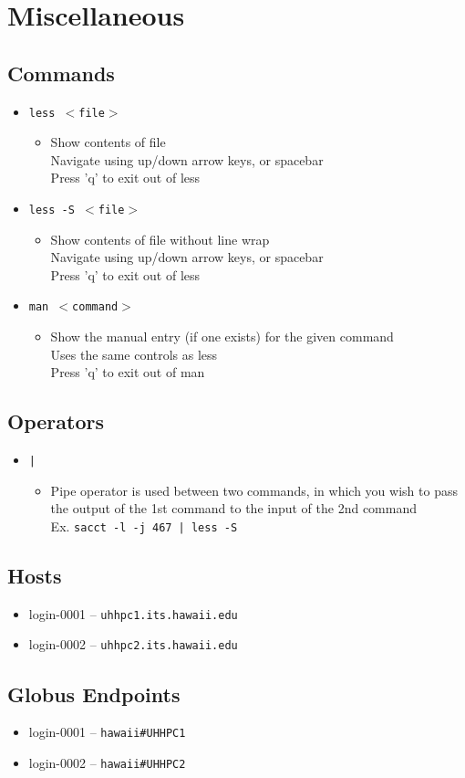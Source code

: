 \documentclass[11pt,twocolumn]{article}
\newcommand{\lft}{$<$}
\newcommand{\rht}{$>$}
\newcommand{\pth}[1]{{\lft}#1{\rht}}
\newcommand{\desc}[1]{\small \begin{itemize}\item[]#1\end{itemize}}
\begin{document}
\section{Miscellaneous}
\subsection{Commands}
\begin{itemize}
\item[] \texttt{less \pth{file}} \desc{Show contents of file\\Navigate using up/down arrow keys, or spacebar\\Press 'q' to exit out of less}
\item[] \texttt{less -S \pth{file}} \desc{Show contents of file without line wrap\\Navigate using up/down arrow keys, or spacebar\\Press 'q' to exit out of less}
\item[] \texttt{man \pth{command}} \desc{Show the manual entry (if one exists) for the given command\\Uses the same controls as less\\Press 'q' to exit out of man}
\end{itemize}

\subsection{Operators}
\begin{itemize}
\item[] \texttt{|} \desc{Pipe operator is used between two commands, in which you wish to pass the output of the 1st command to the input of the 2nd command\\Ex. \texttt{sacct -l -j 467 | less -S }}
\end{itemize}

\subsection{Hosts}
\begin{itemize}
\item[] login-0001 -- \texttt{uhhpc1.its.hawaii.edu}
\item[] login-0002 -- \texttt{uhhpc2.its.hawaii.edu}
\end{itemize}

\subsection{Globus Endpoints}
\begin{itemize}
\item[] login-0001 -- \texttt{hawaii\#UHHPC1}
\item[] login-0002 -- \texttt{hawaii\#UHHPC2}
\end{itemize}
\end{document}
